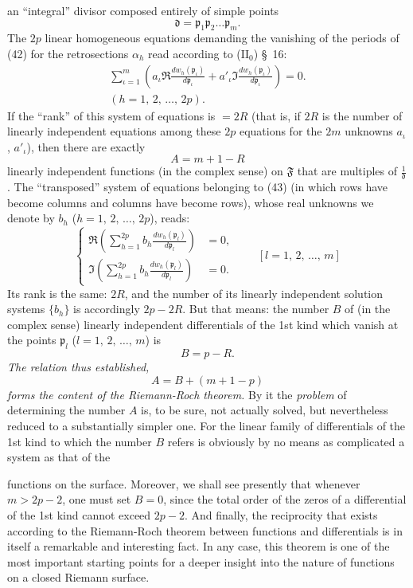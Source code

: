 \documentclass{article}
\begin{document}
an ``integral'' divisor composed entirely of simple points
\[ \mathfrak{d} = \mathfrak{p}_1 \mathfrak{p}_2 \dots \mathfrak{p}_m. \]
The $2p$ linear homogeneous equations demanding the vanishing of the periods of (42) for the retrosections $\alpha_h$ read according to ($\mathrm{II}_0$) §~16:
\[ \begin{gathered}
\sum_{\iota=1}^m \left( a_\iota \Re \frac{dw_h(\mathfrak{p}_\iota)}{d\mathfrak{p}_\iota} + a'_\iota \Im \frac{dw_h(\mathfrak{p}_\iota)}{d\mathfrak{p}_\iota} \right) = 0. \\
(h = 1, \, 2, \, \dots, \, 2p).
\end{gathered} \tag{43} \]
If the ``rank'' of this system of equations is $= 2R$ (that is, if $2R$ is the number of linearly independent equations among these $2p$ equations for the $2m$ unknowns $a_\iota$, $a'_\iota$), then there are exactly
\[ A = m + 1 - R \]
linearly independent functions (in the complex sense) on $\mathfrak{F}$ that are multiples of $\frac{1}{\mathfrak{d}}$. The ``transposed'' system of equations belonging to (43) (in which rows have become columns and columns have become rows), whose real unknowns we denote by $b_h$ ($h = 1, \, 2, \, \dots, \, 2p$), reads:
\[ \left\{ \begin{aligned}
\Re \left( \sum_{h=1}^{2p} b_h \frac{dw_h(\mathfrak{p}_l)}{d\mathfrak{p}_l} \right) &= 0, \\
\Im \left( \sum_{h=1}^{2p} b_h \frac{dw_h(\mathfrak{p}_l)}{d\mathfrak{p}_l} \right) &= 0.
\end{aligned} \right. \qquad [l = 1, \, 2, \, \dots, \, m] \]
Its rank is the same: $2R$, and the number of its linearly independent solution systems $\{b_h\}$ is accordingly $2p - 2R$. But that means: the number $B$ of (in the complex sense) linearly independent differentials of the 1st kind which vanish at the points $\mathfrak{p}_l$ ($l = 1, \, 2, \, \dots, \, m$) is
\[ B = p - R. \]
\emph{The relation thus established,}
\[ A = B + (m + 1 - p) \]
\emph{forms the content of the Riemann-Roch theorem.} By it the \emph{problem} of determining the number $A$ is, to be sure, not actually solved, but nevertheless reduced to a substantially simpler one. For the linear family of differentials of the 1st kind to which the number $B$ refers is obviously by no means as complicated a system as that of the

functions on the surface. Moreover, we shall see presently that whenever $m > 2p - 2$, one must set $B = 0$, since the total order of the zeros of a differential of the 1st kind cannot exceed $2p - 2$. And finally, the reciprocity that exists according to the Riemann-Roch theorem between functions and differentials is in itself a remarkable and interesting fact. In any case, this theorem is one of the most important starting points for a deeper insight into the nature of functions on a closed Riemann surface.
\end{document}
